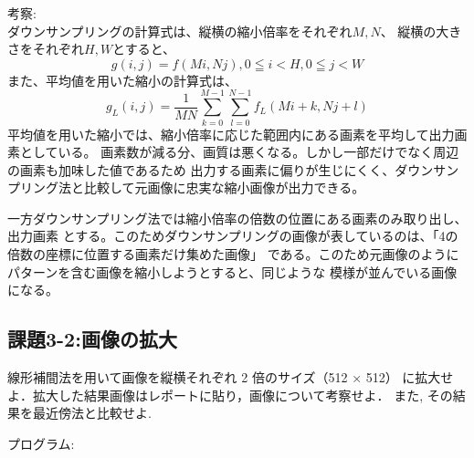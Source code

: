 \documentclass[a4paper,titlepage,11pt]{ltjsarticle}
\begin{document}
考察:\\
ダウンサンプリングの計算式は、縦横の縮小倍率をそれぞれ$M,N$、
縦横の大きさをそれぞれ$H,W$とすると、
\begin{equation}
	g(i,j)=f(Mi,Nj), 0 \leqq i < H , 0 \leqq j < W
\end{equation}
また、平均値を用いた縮小の計算式は、
\begin{equation}
	g_{L}(i,j)=\frac{1}{MN}\sum_{k=0}^{M-1}\sum_{l=0}^{N-1}f_{L}(Mi+k,Nj+l)
\end{equation}
平均値を用いた縮小では、縮小倍率に応じた範囲内にある画素を平均して出力画素としている。
画素数が減る分、画質は悪くなる。しかし一部だけでなく周辺の画素も加味した値であるため
出力する画素に偏りが生じにくく、ダウンサンプリング法と比較して元画像に忠実な縮小画像が出力できる。

一方ダウンサンプリング法では縮小倍率の倍数の位置にある画素のみ取り出し、出力画素
とする。このためダウンサンプリングの画像が表しているのは、「4の倍数の座標に位置する画素だけ集めた画像」
である。このため元画像のようにパターンを含む画像を縮小しようとすると、同じような
模様が並んでいる画像になる。

\subsection*{課題3-2:画像の拡大}
線形補間法を用いて画像を縦横それぞれ 2 倍のサイズ（512 × 512）
に拡大せよ．拡大した結果画像はレポートに貼り，画像について考察せよ．
また, その結果を最近傍法と比較せよ.

プログラム:
\end{document}
